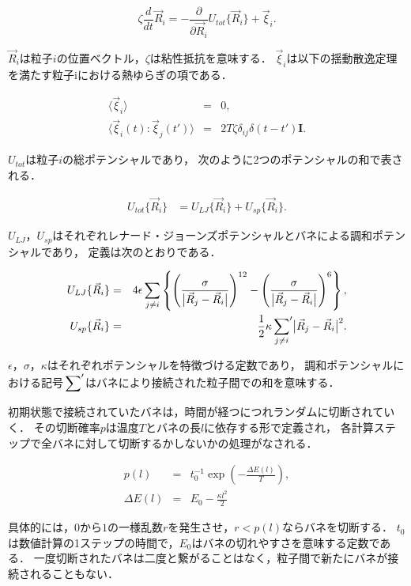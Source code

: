 \begin{equation}
\label{eq:main}
\zeta
\frac{d}{dt}
\vec{R}_i
=
-\frac{\partial}{\partial\vec{R}_i}
U_{tot}\{\vec{R}_i\}
+\vec{\xi}_i
.
\end{equation}

$\vec{R}_i$は粒子$i$の位置ベクトル，$\zeta$は粘性抵抗を意味する．
$\vec{\xi}_i$は以下の揺動散逸定理を満たす粒子iにおける熱ゆらぎの項である．

\begin{eqnarray}
\label{eq:langevin0}
\langle\vec{\xi}_i\rangle &=& 0, \\
\label{eq:langevin1}
\langle\vec{\xi}_i(t):\vec{\xi}_j(t')\rangle &=& 2T\zeta\delta_{ij}\delta(t-t')\bm{I}.
\end{eqnarray}

$U_{tot}$は粒子$i$の総ポテンシャルであり，
次のように2つのポテンシャルの和で表される．

\begin{eqnarray}
U_{tot}\{\vec{R}_i\}
&=
 U_{LJ}\{\vec{R}_i\}
+U_{sp}\{\vec{R}_i\}.
\end{eqnarray}

$U_{LJ}$，$U_{sp}$はそれぞれレナード・ジョーンズポテンシャルとバネによる調和ポテンシャルであり，
定義は次のとおりである．

\begin{eqnarray}
U_{LJ}\{\vec{R}_i\}
&=&
4\epsilon\sum_{j\neq i}
\left\{
\left(
\frac{\sigma}{\bigl|\vec{R}_j-\vec{R}_i\bigr|}
\right)^{12}
-
\left(
\frac{\sigma}{\bigl|\vec{R}_j-\vec{R}_i\bigr|}
\right)^{6}
\right\},
\\
U_{sp}\{\vec{R}_i\}
&=&
\frac{1}{2}
\kappa
\sideset{}{'}\sum_{j\neq i}
\bigl|\vec{R}_j-\vec{R}_i\bigr|^{2}.
\end{eqnarray}

$\epsilon$，$\sigma$，$\kappa$はそれぞれポテンシャルを特徴づける定数であり，
調和ポテンシャルにおける記号$\sideset{}{'}\sum$はバネにより接続された粒子間での和を意味する．

初期状態で接続されていたバネは，時間が経つにつれランダムに切断されていく．
その切断確率$p$は温度$T$とバネの長$l$に依存する形で定義され，
各計算ステップで全バネに対して切断するかしないかの処理がなされる．

\begin{eqnarray}
p(l)
&=&
t_0^{-1}
\exp\left(-\frac{\Delta E(l)}{T}\right)
,\\
\Delta E(l)
&=&
E_0-\frac{\kappa l^2}{2}
\end{eqnarray}

具体的には，$0$から$1$の一様乱数$r$を発生させ，$r<p(l)$ならバネを切断する．
$t_0$は数値計算の1ステップの時間で，$E_0$はバネの切れやすさを意味する定数である．
一度切断されたバネは二度と繋がることはなく，粒子間で新たにバネが接続されることもない．


